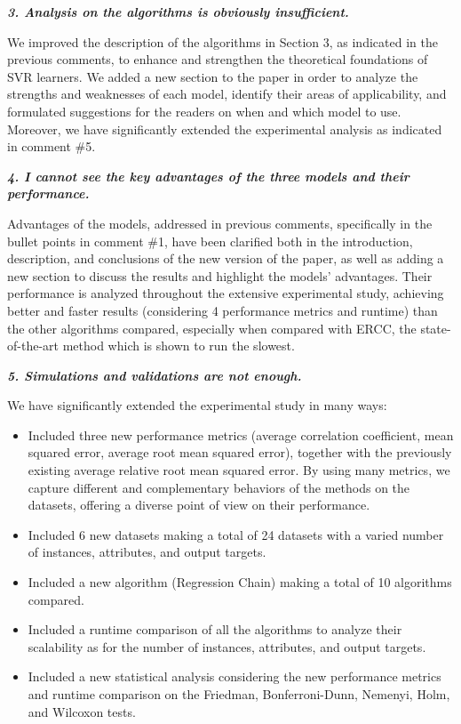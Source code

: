 \documentclass[a4paper,notitlepage]{article}
\begin{document}
\noindent \textbf{\textit{3. Analysis on the algorithms is obviously insufficient.}}
 
\medskip

\noindent We improved the description of the algorithms in Section 3, as indicated in the previous comments, to enhance and strengthen the theoretical foundations of SVR learners. We added a new section to the paper in order to analyze the strengths and weaknesses of each model, identify their areas of applicability, and formulated suggestions for the readers on when and which model to use. Moreover, we have significantly extended the experimental analysis as indicated in comment \#5.
 
\noindent \textbf{\textit{4. I cannot see the key advantages of the three models and their performance.}}
 
\medskip

\noindent Advantages of the models, addressed in previous comments, specifically in the bullet points in comment \#1, have been clarified both in the introduction, description, and conclusions of the new version of the paper, as well as adding a new section to discuss the results and highlight the models' advantages. Their performance is analyzed throughout the extensive experimental study, achieving better and faster results (considering 4 performance metrics and runtime) than the other algorithms compared, especially when compared with ERCC, the state-of-the-art method which is shown to run the slowest.
 
\noindent \textbf{\textit{5. Simulations and validations are not enough.}}
 
\medskip

\noindent We have significantly extended the experimental study in many ways:

\begin{itemize}
\item Included three new performance metrics (average correlation coefficient, mean squared error, average root mean squared error), together with the previously existing average relative root mean squared error. By using many metrics, we capture different and complementary behaviors of the methods on the datasets, offering a diverse point of view on their performance. 
\item Included 6 new datasets making a total of 24 datasets with a varied number of instances, attributes, and output targets.
\item Included a new algorithm (Regression Chain) making a total of 10 algorithms compared.
\item Included a runtime comparison of all the algorithms to analyze their scalability as for the number of instances, attributes, and output targets.
\item Included a new statistical analysis considering the new performance metrics and runtime comparison on the Friedman, Bonferroni-Dunn, Nemenyi, Holm, and Wilcoxon tests.
\end{itemize}
\end{document}
